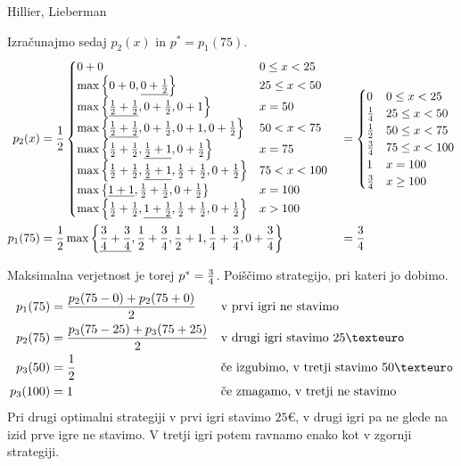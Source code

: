 \begin{naloga}{Hillier, Lieberman}{\cite[Problem~11.4-1]{hl}}
\begin{odgovor}
Izračunajmo sedaj $p_2(x)$ in $p^* = p_1(75)$.
\begin{alignat*}{2}
p_2(x) &= {1 \over 2} \begin{cases}
0+0 & 0 \le x < 25 \\
\max\left\{0+0, \underline{0+{1 \over 2}}\right\} & 25 \le x < 50 \\
\max\left\{\underline{{1 \over 2}+{1 \over 2}}, 0+{1 \over 2},
           0+1\right\} & x = 50 \\
\max\left\{\underline{{1 \over 2}+{1 \over 2}}, 0+{1 \over 2},
           0+1, 0+{1 \over 2}\right\} & 50 < x < 75 \\
\max\left\{{1 \over 2}+{1 \over 2}, \underline{{1 \over 2}+1},
           0+{1 \over 2}\right\} & x = 75 \\
\max\left\{{1 \over 2}+{1 \over 2}, \underline{{1 \over 2}+1},
           {1 \over 2}+{1 \over 2}, 0+{1 \over 2}\right\} & 75 < x < 100 \\
\max\left\{\underline{1+1}, {1 \over 2}+{1 \over 2},
           0+{1 \over 2}\right\} & x = 100 \\
\max\left\{{1 \over 2}+{1 \over 2}, \underline{1+{1 \over 2}},
           {1 \over 2}+{1 \over 2}, 0+{1 \over 2}\right\} & x > 100
\end{cases}
&&= \begin{cases}
0 & 0 \le x < 25 \\
{1 \over 4} & 25 \le x < 50 \\
{1 \over 2} & 50 \le x < 75 \\
{3 \over 4} & 75 \le x < 100 \\
1 & x = 100 \\
{3 \over 4} & x \ge 100
\end{cases} \\
p_1(75) &= {1 \over 2} \max\left\{\underline{{3 \over 4}+{3 \over 4}},
                                  {1 \over 2}+{3 \over 4},
                                  {1 \over 2}+1,
                                  {1 \over 4}+{3 \over 4},
                                  0+{3 \over 4}\right\} &&= {3 \over 4}
\end{alignat*}

\needspace{\baselineskip}
\noindent
Maksimalna verjetnost je torej $p^* = {3 \over 4}$.
Poiščimo strategijo, pri kateri jo dobimo.
\begin{align*}
p_1(75) &= {p_2(75-0) + p_2(75+0) \over 2}
&& \text{v prvi igri ne stavimo} \\
p_2(75) &= {p_3(75-25) + p_3(75+25) \over 2}
&& \text{v drugi igri stavimo $25 €$} \\
p_3(50) &= {1 \over 2}
&& \text{če izgubimo, v tretji stavimo $50 €$} \\
p_3(100) &= 1
&& \text{če zmagamo, v tretji ne stavimo}
\end{align*}
Pri drugi optimalni strategiji v prvi igri stavimo $25 €$,
v drugi igri pa ne glede na izid prve igre ne stavimo.
V tretji igri potem ravnamo enako kot v zgornji strategiji.
\end{odgovor}
\end{naloga}
